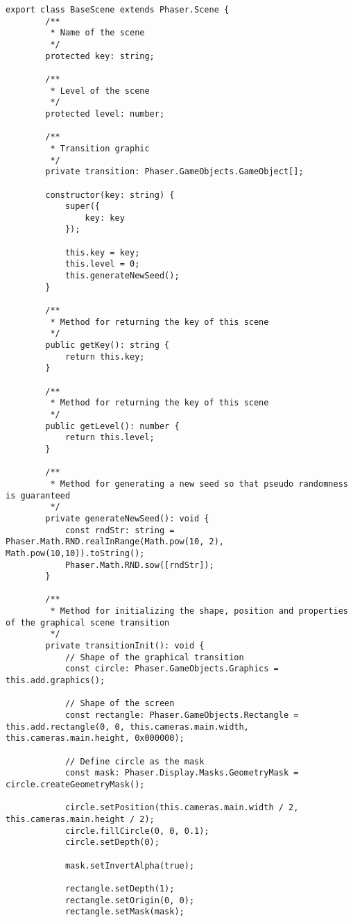 \begin{lstlisting}[style=TypeScript, caption=BaseScene.ts]
    export class BaseScene extends Phaser.Scene {
        /**
         * Name of the scene
         */
        protected key: string;

        /**
         * Level of the scene
         */
        protected level: number;

        /**
         * Transition graphic
         */
        private transition: Phaser.GameObjects.GameObject[];

        constructor(key: string) {
            super({
                key: key
            });

            this.key = key;
            this.level = 0;
            this.generateNewSeed();
        }

        /**
         * Method for returning the key of this scene
         */
        public getKey(): string {
            return this.key;
        }

        /**
         * Method for returning the key of this scene
         */
        public getLevel(): number {
            return this.level;
        }

        /**
         * Method for generating a new seed so that pseudo randomness is guaranteed
         */
        private generateNewSeed(): void {
            const rndStr: string = Phaser.Math.RND.realInRange(Math.pow(10, 2), Math.pow(10,10)).toString();
            Phaser.Math.RND.sow([rndStr]);
        }

        /**
         * Method for initializing the shape, position and properties of the graphical scene transition
         */
        private transitionInit(): void {
            // Shape of the graphical transition
            const circle: Phaser.GameObjects.Graphics = this.add.graphics();

            // Shape of the screen
            const rectangle: Phaser.GameObjects.Rectangle = this.add.rectangle(0, 0, this.cameras.main.width, this.cameras.main.height, 0x000000);

            // Define circle as the mask
            const mask: Phaser.Display.Masks.GeometryMask = circle.createGeometryMask();

            circle.setPosition(this.cameras.main.width / 2, this.cameras.main.height / 2);
            circle.fillCircle(0, 0, 0.1);
            circle.setDepth(0);

            mask.setInvertAlpha(true);

            rectangle.setDepth(1);
            rectangle.setOrigin(0, 0);
            rectangle.setMask(mask);


\end{lstlisting}
